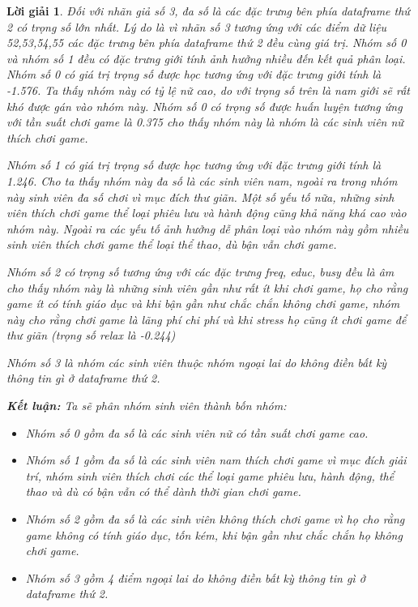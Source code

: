 \documentclass[14pt, a4paper]{article}
\theoremstyle{sltheorem}
\theoremstyle{soltheorem}
\newtheorem*{loigiai}{Lời giải}
\begin{document}
\begin{loigiai}
    Đối với nhãn giả số 3, đa số là các đặc trưng bên phía dataframe thứ 2 có trọng số lớn nhất.
    Lý do là vì nhãn số 3 tương ứng với các điểm dữ liệu 52,53,54,55 các đặc trưng bên phía dataframe thứ 2 đều cùng giá trị.
    Nhóm số 0 và nhóm số 1 đều có đặc trưng giới tính ảnh hưởng nhiều đến kết quả phân loại.
    Nhóm số 0 có giá trị trọng số được học tương ứng với đặc trưng giới tính là -1.576.
    Ta thấy nhóm này có tỷ lệ nữ cao, do với trọng số trên là nam giới sẽ rất khó được gán vào nhóm này.
    Nhóm số 0 có trọng số được huấn luyện tương ứng với tần suất chơi game là 0.375 cho thấy nhóm này là nhóm là các sinh viên nữ thích chơi game.


    Nhóm số 1 có giá trị trọng số được học tương ứng với đặc trưng giới tính là 1.246.
    Cho ta thấy nhóm này đa số là các sinh viên nam, ngoài ra trong nhóm này sinh viên đa số chơi vì mục đích thư giãn.
    Một số yếu tố nữa, những sinh viên thích chơi game thể loại phiêu lưu và hành động cũng khả năng khá cao vào nhóm này.
    Ngoài ra các yếu tố ảnh hưởng dễ phân loại vào nhóm này gồm nhiều sinh viên thích chơi game thể loại thể thao, dù bận vẫn chơi game.

    Nhóm số 2 có trọng số tương ứng với các đặc trưng freq, educ, busy đều là âm cho thấy nhóm này là những sinh viên gần như rất ít khi chơi game,
    họ cho rằng game ít có tính giáo dục và khi bận gần như chắc chắn không chơi game, nhóm này cho rằng chơi game là lãng phí chi phí và khi stress họ cũng ít chơi game để thư giãn (trọng số relax là -0.244)

    Nhóm số 3 là nhóm các sinh viên thuộc nhóm ngoại lai do không điền bất kỳ thông tin gì ở dataframe thứ 2.

    \textbf{Kết luận:} Ta sẽ phân nhóm sinh viên thành bốn nhóm:
    \begin{itemize}
        \item Nhóm số 0 gồm đa số là các sinh viên nữ có tần suất chơi game cao.
        \item Nhóm số 1 gồm đa số là các sinh viên nam thích chơi game vì mục đích giải trí, nhóm sinh viên thích chơi các thể loại game phiêu lưu, hành động, thể thao và dù có bận vẫn có thể dành thời gian chơi game.
        \item Nhóm số 2 gồm đa số là các sinh viên không thích chơi game vì họ cho rằng game không có tính giáo dục, tốn kém, khi bận gần như chắc chắn họ không chơi game.
        \item Nhóm số 3 gồm 4 điểm ngoại lai do không điền bất kỳ thông tin gì ở dataframe thứ 2.
    \end{itemize}
\end{loigiai}

\newpage
\printbibliography[title={TÀI LIỆU THAM KHẢO}]
\end{document}
